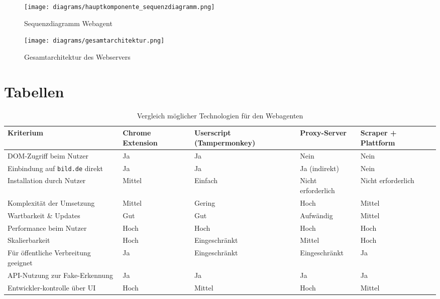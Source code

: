 \begin{figure}[htbp]
    \begin{center}
        \texttt{[image: diagrams/hauptkomponente\_sequenzdiagramm.png]}
        \caption{\label{fig:seq_hauptkomponente} Sequenzdiagramm Webagent}
    \end{center}
\end{figure}

\begin{figure}[htbp]
    \begin{center}
        \texttt{[image: diagrams/gesamtarchitektur.png]}
        \caption{\label{fig:gesamtarchitektur} Gesamtarchitektur des Webservers}
    \end{center}
\end{figure}

\newpage

\section{Tabellen}

\begin{table}[htbp]
    \centering
    \renewcommand{\arraystretch}{1.3}
    \begin{tabular}{|p{2.5cm}|p{2.5cm}|p{2.5cm}|p{2.5cm}|p{2.5cm}|}
        \hline
        \rowcolor{lightgray} \textbf{Kriterium} & \textbf{Chrome Extension} & \textbf{Userscript (Tampermonkey)} & \textbf{Proxy-Server} & \textbf{Scraper + Plattform} \\
        \hline
        DOM-Zugriff beim Nutzer & Ja & Ja & Nein & Nein \\
        \hline
        Einbindung auf \texttt{bild.de} direkt & Ja & Ja & Ja (indirekt) & Nein \\
        \hline
        Installation durch Nutzer & Mittel & Einfach & Nicht erforderlich & Nicht erforderlich\\
        \hline
        Komplexität der Umsetzung & Mittel & Gering & Hoch & Mittel \\
        \hline
        Wartbarkeit \& Updates & Gut & Gut & Aufwändig & Mittel \\
        \hline
        Performance beim Nutzer & Hoch & Hoch & Hoch & Hoch \\
        \hline
        Skalierbarkeit & Hoch & Eingeschränkt & Mittel & Hoch \\
        \hline
        Für öffentliche Verbreitung geeignet & Ja & Eingeschränkt & Eingeschränkt & Ja \\
        \hline
        API-Nutzung zur Fake-Erkennung & Ja & Ja & Ja & Ja \\
        \hline
        Entwickler-kontrolle über UI & Hoch & Mittel & Hoch & Mittel \\
        \hline
    \end{tabular}
    \caption{Vergleich möglicher Technologien für den Webagenten}
    \label{table:technischeAnsaetze}
\end{table}


